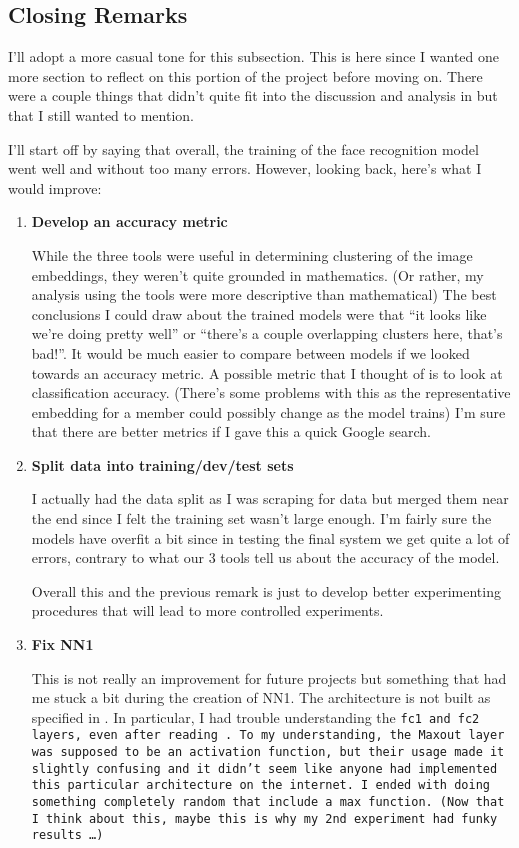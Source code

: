\subsection{Closing Remarks}\label{Section:Face-Recognition:Remarks}

I'll adopt a more casual tone for this subsection.
This is here since I wanted one more section to reflect on this portion of the project before moving on.
There were a couple things that didn't quite fit into the discussion and analysis in  but that I still wanted to mention.

I'll start off by saying that overall, the training of the face recognition model went well and without too many errors.
However, looking back, here's what I would improve:
\begin{enumerate}[left=0pt]
\item \bf{Develop an accuracy metric}

While the three tools were useful in determining clustering of the image embeddings, they weren't quite grounded in mathematics.
(Or rather, my analysis using the tools were more descriptive than mathematical)
The best conclusions I could draw about the trained models were that ``it looks like we're doing pretty well'' or ``there's a couple overlapping clusters here, that's bad!''.
It would be much easier to compare between models if we looked towards an accuracy metric.
A possible metric that I thought of is to look at classification accuracy.
(There's some problems with this as the representative embedding for a member could possibly change as the model trains)
I'm sure that there are better metrics if I gave this a quick Google search.

\item \bf{Split data into training/dev/test sets}

I actually had the data split as I was scraping for data but merged them near the end since I felt the training set wasn't large enough.
I'm fairly sure the models have overfit a bit since in testing the final system we get quite a lot of errors, contrary to what our 3 tools tell us about the accuracy of the model.

Overall this and the previous remark is just to develop better experimenting procedures that will lead to more controlled experiments.

\item \bf{Fix NN1} 

This is not really an improvement for future projects but something that had me stuck a bit during the creation of NN1.
The architecture is not built as specified in \cite{facenet}.
In particular, I had trouble understanding the \tt{fc1} and \tt{fc2} layers, even after reading \cite{maxout}.
To my understanding, the Maxout layer was supposed to be an activation function, but their usage made it slightly confusing and it didn't seem like anyone had implemented this particular architecture on the internet. 
I ended with doing something completely random that include a \tt{max} function.
(Now that I think about this, maybe this is why my 2nd experiment had funky results \ldots)
\end{enumerate}
